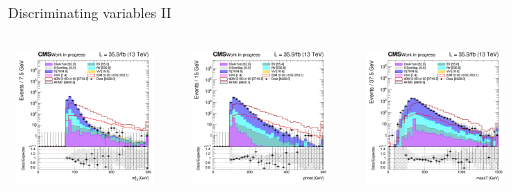 \documentclass[8pt]{beamer}
\begin{document}
\begin{frame}{Discriminating variables II}
\begin{columns}
\begin{column}{1.09\textwidth}
\begin{block}{}\end{block} \vspace{5pt}
\end{column}
\end{columns} \vspace{-5pt}
\begin{columns}
		\begin{column}{0.33\textwidth}
			\begin{center}
     			\includegraphics[width=1.0\textwidth, height=100pt]{figs/2016/SmearSR-ttDM-scalar100/log_cratio_topCR_ll_mt2ll.png}
    		\end{center}		
		\end{column} 
		\begin{column}{0.33\textwidth}
			\begin{center}
     			\includegraphics[width=1.0\textwidth, height=100pt]{figs/2016/SmearSR-ttDM-scalar100/log_cratio_topCR_ll_METcorrected_pt.png}
    		\end{center}		
		\end{column} 
		\begin{column}{0.33\textwidth}
			\begin{center}
     			\includegraphics[width=1.0\textwidth, height=100pt]{figs/2016/SmearSR-ttDM-scalar100/log_cratio_topCR_ll_massT.png}

\end{center}
\end{column}
\end{columns}
\end{frame}
\end{document}
